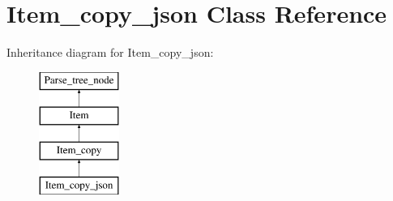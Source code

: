 \hypertarget{classItem__copy__json}{}\section{Item\+\_\+copy\+\_\+json Class Reference}
\label{classItem__copy__json}
Inheritance diagram for Item\+\_\+copy\+\_\+json\+:\begin{figure}[H]
\begin{center}
\leavevmode
\includegraphics[height=4.000000cm]{classItem__copy__json}
\end{center}
\end{figure}
